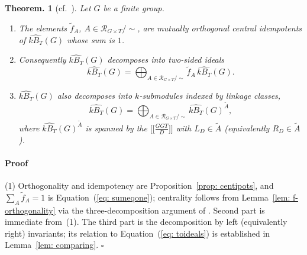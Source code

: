 \documentclass[12pt]{article}
\theoremstyle{change}
\newtheorem{theorem}{Theorem.}[section]
\newenvironment{proof}{\paragraph{Proof}}{\hfill$\square$}
\newcommand{\calR}{\mathcal{R}}
\newcommand{\1}{{\bf 1}}
\begin{document}
\begin{theorem}[cf.\ {\cite[Corollary 6.4]{BC}}]
\label{thm: central ipots}
Let $G$ be a finite group.
\begin{enumerate}
  \item The elements $\widetilde{f}_A$, $A\in\calR_{G\times T}/\sim$, are mutually orthogonal
        central idempotents of $\widehat{kB_T}(G)$ whose sum is $1$.
  \item Consequently $\widehat{kB_T}(G)$ decomposes into two-sided ideals
        \begin{equation}\label{eq: toideals}
          \widehat{kB_T}(G)=\bigoplus_{A\in\calR_{G\times T}/\sim}\widetilde{f}_A\,\widehat{kB_T}(G).
        \end{equation}
  \item $\widehat{kB_T}(G)$ also decomposes into $k$-submodules indexed by linkage classes,
        \begin{equation}\label{eq: tosubmodules}
          \widehat{kB_T}(G)=\bigoplus_{A\in\calR_{G\times T}/\sim}\widehat{kB_T}(G)^{\widetilde{A}},
        \end{equation}
        where $\widehat{kB_T}(G)^{\widetilde{A}}$ is spanned by the
        $\big[\big[\tfrac{GGT}{D}\big]\big]$ with $L_D\in\widetilde{A}$ (equivalently $R_D\in\widetilde{A}$).
\end{enumerate}
\end{theorem}
\begin{proof}
(1) Orthogonality and idempotency are Proposition~\ref{prop: centipots}, and
$\sum_A\widetilde{f}_A=1$ is Equation~(\ref{eq: sumeqone}); centrality follows from
Lemma~\ref{lem: f-orthogonality} via the three-decomposition argument of {\cite[Corollary 6.4]{BC}}.
Second part is immediate from~(1). The third part is the decomposition by left (equivalently right) invariants; its relation to Equation~(\ref{eq: toideals}) is established in Lemma~\ref{lem: comparing}.
\end{proof}
\end{document}
